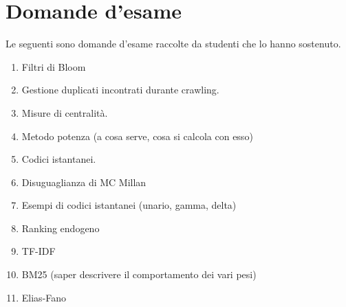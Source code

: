 \documentclass[\main/main.tex]{subfiles}
\begin{document}
\chapter{Domande d'esame}
Le seguenti sono domande d'esame raccolte da studenti che lo hanno sostenuto.
\begin{enumerate}
    \item Filtri di Bloom
    \item Gestione duplicati incontrati durante crawling.
    \item Misure di centralità.
    \item Metodo potenza (a cosa serve, cosa si calcola con esso)
    \item Codici istantanei.
    \item Disuguaglianza di MC Millan
    \item Esempi di codici istantanei (unario, gamma, delta)
    \item Ranking endogeno
    \item TF-IDF
    \item BM25 (saper descrivere il comportamento dei vari pesi)
    \item Elias-Fano
\end{enumerate}
\end{document}
